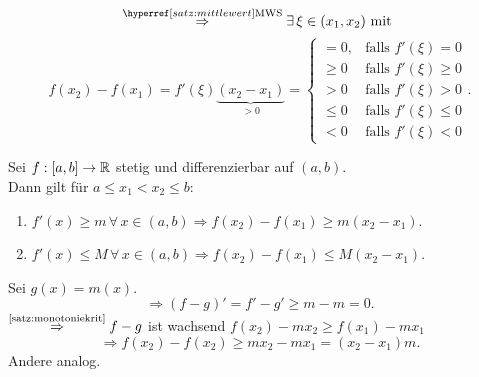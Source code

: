 \documentclass[../ana1.tex]{subfiles}
\begin{document}
\begin{bew}
    \[ \overref{satz:mittlewert}{MWS}{\Rightarrow} \exists \, 
    \xi \in (x_1, x_2) \text{ mit } \]
    \[ f(x_2) - f(x_1) = f'(\xi) \underbrace{(x_2 - x_1)}_{>0}
    = \begin{cases}
        =0, & \text{falls } f'(\xi) = 0\\
        \geq 0 &\text{falls } f'(\xi) \geq 0\\
        > 0 &\text{falls } f'(\xi) > 0\\
        \leq 0 &\text{falls } f'(\xi) \leq 0\\
        < 0 &\text{falls } f'(\xi) < 0
    \end{cases}. \]
\end{bew}
\begin{kor}[Schrankensatz]
    Sei \( f: [a,b] \rightarrow \mathbb{R} \) stetig und differenzierbar 
    auf \( (a,b) \).\\
    Dann gilt für \( a \leq x_1 < x_2 \leq b \): 
    \begin{enumerate}
        \item \( f'(x) \geq m \,\forall \, x \in (a,b) 
        \Rightarrow f(x_2) - f(x_1) \geq m(x_2 - x_1) \).
        \item \( f'(x) \leq M \, \forall \, x\in (a,b) 
        \Rightarrow f(x_2) - f(x_1) \leq M(x_2 - x_1) \).
    \end{enumerate}
\end{kor}
\begin{bew}
    Sei \( g(x) = m(x) \).
    \[ \Rightarrow (f - g)' = f' - g' \geq m - m = 0. \]
    \( \oversett{\autoref{satz:monotoniekrit}}{\Rightarrow} 
    f - g \) ist wachsend \dphp{} \( f(x_2) - m x_2 \geq 
    f(x_1) - m x_1 \) 
    \[ \Rightarrow f(x_2) - f(x_2) \geq m x_2 - m x_1 
    = (x_2 - x_1)m. \]
    Andere analog.
\end{bew}
\end{document}
